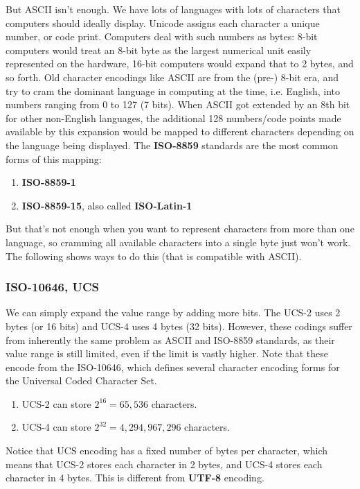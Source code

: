     But ASCII isn't enough. We have lots of languages with lots of characters that computers should ideally display. Unicode assigns each character a unique number, or code print. Computers deal with such numbers as bytes: 8-bit computers would treat an 8-bit byte as the largest numerical unit easily represented on the hardware, 16-bit computers would expand that to 2 bytes, and so forth. Old character encodings like ASCII are from the (pre-) 8-bit era, and try to cram the dominant language in computing at the time, i.e. English, into numbers ranging from 0 to 127 (7 bits). When ASCII got extended by an 8th bit for other non-English languages, the additional 128 numbers/code points made available by this expansion would be mapped to different characters depending on the language being displayed. The \textbf{ISO-8859} standards are the most common forms of this mapping: 
    \begin{enumerate}
      \item \textbf{ISO-8859-1}
      \item \textbf{ISO-8859-15}, also called \textbf{ISO-Latin-1}
    \end{enumerate}
    But that's not enough when you want to represent characters from more than one language, so cramming all available characters into a single byte just won't work. The following shows ways to do this (that is compatible with ASCII). 

  \subsubsection{ISO-10646, UCS}

    We can simply expand the value range by adding more bits. The UCS-2 uses 2 bytes (or 16 bits) and UCS-4 uses 4 bytes (32 bits). However, these codings suffer from inherently the same problem as ASCII and ISO-8859 standards, as their value range is still limited, even if the limit is vastly higher. Note that these encode from the ISO-10646, which defines several character encoding forms for the Universal Coded Character Set. 
    \begin{enumerate}
        \item UCS-2 can store $2^{16} = 65,536$ characters. 
        \item UCS-4 can store $2^{32} = 4,294,967,296$ characters. 
    \end{enumerate}
    Notice that UCS encoding has a fixed number of bytes per character, which means that UCS-2 stores each character in 2 bytes, and UCS-4 stores each character in 4 bytes. This is different from \textbf{UTF-8} encoding. 

